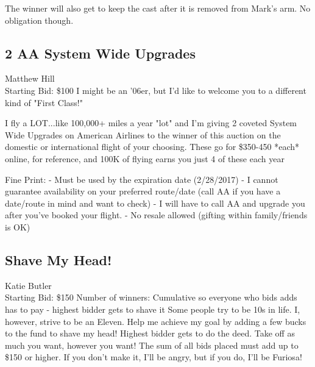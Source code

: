 \documentclass[11pt]{article}
\begin{document}
The winner will also get to keep the cast after it is removed from Mark's arm. No obligation though.
\subsection{2 AA System Wide Upgrades}
Matthew Hill
\\
Starting Bid: \$100
\newline
I might be an '06er, but I'd like to welcome you to a different kind of "First Class!"

I fly a LOT...like 100,000+ miles a year "lot" and I'm giving 2 coveted System Wide Upgrades on American Airlines to the winner of this auction on the domestic or international flight of your choosing. These go for \$350-450 *each* online, for reference, and 100K of flying earns you just 4 of these each year

Fine Print: 
  - Must be used by the expiration date (2/28/2017)
  - I cannot guarantee availability on your preferred route/date (call AA if you have a date/route in mind and want to check)
  - I will have to call AA and upgrade you after you've booked your flight.
  - No resale allowed (gifting within family/friends is OK)
\subsection{Shave My Head!}
Katie Butler
\\
Starting Bid: \$150
\newline
Number of winners: Cumulative so everyone who bids adds has to pay - highest bidder gets to shave it
\newline
Some people try to be 10s in life. I, however, strive to be an Eleven. Help me achieve my goal by adding a few bucks to the fund to shave my head! Highest bidder gets to do the deed. Take off as much you want, however you want! The sum of all bids placed must add up to \$150 or higher. If you don't make it, I'll be angry, but if you do, I'll be Furiosa!
\end{document}
